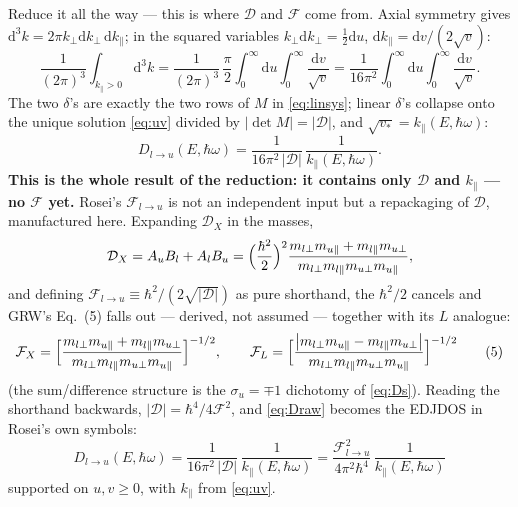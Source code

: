 \documentclass[11pt,a4paper]{article}
\numberwithin{equation}{section}
\newcommand{\hw}{\hbar\omega}
\newcommand{\cD}{\mathcal{D}}
\newcommand{\cF}{\mathcal{F}}
\newcommand{\kperp}{k_{\perp}}
\newcommand{\kpar}{k_{\parallel}}
\newcommand{\dd}{\mathrm{d}}
\newcommand{\Dlu}{D_{l\to u}}
\begin{document}
Reduce it all the way --- this is where $\cD$ and $\cF$ come from.
Axial symmetry gives $\dd^3k=2\pi\kperp\dd\kperp\,\dd\kpar$; in the
squared variables $\kperp\dd\kperp=\tfrac12\dd u$,
$\dd\kpar=\dd v/(2\sqrt v)$:
\begin{equation}
\frac{1}{(2\pi)^3}\int_{\kpar>0}\!\!\dd^3k
=\frac{1}{(2\pi)^3}\,\frac{\pi}{2}
\int_0^\infty\!\!\dd u\int_0^\infty\!\frac{\dd v}{\sqrt v}
=\frac{1}{16\pi^2}\int_0^\infty\!\!\dd u\int_0^\infty\!\frac{\dd v}{\sqrt v}.
\end{equation}
The two $\delta$'s are exactly the two rows of $M$ in
\eqref{eq:linsys}; linear $\delta$'s collapse onto the unique solution
\eqref{eq:uv} divided by $|\det M|=|\cD|$, and $\sqrt{v_*}=\kpar(E,\hw)$:
\begin{equation}
\Dlu(E,\hw)=\frac{1}{16\pi^2\,|\cD|}\,\frac{1}{\kpar(E,\hw)} .
\label{eq:Draw}
\end{equation}
\textbf{This is the whole result of the reduction: it contains only
$\cD$ and $\kpar$ --- no $\cF$ yet.}  Rosei's $\cF_{l\to u}$ is not an
independent input but a repackaging of $\cD$, manufactured here.
Expanding $\cD_X$ in the masses,
\begin{equation}
\cD_X=A_uB_l+A_lB_u
=\Bigl(\frac{\hbar^2}{2}\Bigr)^{2}
\frac{m_{l\perp}m_{u\parallel}+m_{l\parallel}m_{u\perp}}
{m_{l\perp}m_{l\parallel}m_{u\perp}m_{u\parallel}},
\end{equation}
and defining $\cF_{l\to u}\equiv\hbar^2/(2\sqrt{|\cD|})$ as pure
shorthand, the $\hbar^2/2$ cancels and GRW's Eq.~(5) falls out ---
derived, not assumed --- together with its $L$ analogue:
\begin{equation}
\cF_X=\Bigl[\frac{m_{l\perp}m_{u\parallel}+m_{l\parallel}m_{u\perp}}
{m_{l\perp}m_{l\parallel}m_{u\perp}m_{u\parallel}}\Bigr]^{-1/2},
\qquad
\cF_L=\Bigl[\frac{\bigl|m_{l\perp}m_{u\parallel}-m_{l\parallel}m_{u\perp}\bigr|}
{m_{l\perp}m_{l\parallel}m_{u\perp}m_{u\parallel}}\Bigr]^{-1/2}
\tag{5}
\label{eq:Fmass}
\end{equation}
(the sum/difference structure is the $\sigma_u=\mp1$ dichotomy of
\eqref{eq:Ds}).  Reading the shorthand backwards,
$|\cD|=\hbar^4/4\cF^2$, and \eqref{eq:Draw} becomes the EDJDOS in
Rosei's own symbols:
\begin{equation}
\boxed{\;
\Dlu(E,\hw)=\frac{1}{16\pi^2\,|\cD|}\,\frac{1}{\kpar(E,\hw)}
=\frac{\cF_{l\to u}^{2}}{4\pi^2\hbar^{4}}\,\frac{1}{\kpar(E,\hw)}
\;}
\tag{4$'$}
\label{eq:D4p}
\end{equation}
supported on $u,v\ge0$, with $\kpar$ from \eqref{eq:uv}.
\end{document}
